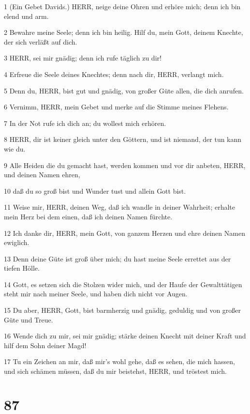 \par 1 (Ein Gebet Davids.) HERR, neige deine Ohren und erhöre mich; denn ich bin elend und arm.
\par 2 Bewahre meine Seele; denn ich bin heilig. Hilf du, mein Gott, deinem Knechte, der sich verläßt auf dich.
\par 3 HERR, sei mir gnädig; denn ich rufe täglich zu dir!
\par 4 Erfreue die Seele deines Knechtes; denn nach dir, HERR, verlangt mich.
\par 5 Denn du, HERR, bist gut und gnädig, von großer Güte allen, die dich anrufen.
\par 6 Vernimm, HERR, mein Gebet und merke auf die Stimme meines Flehens.
\par 7 In der Not rufe ich dich an; du wollest mich erhören.
\par 8 HERR, dir ist keiner gleich unter den Göttern, und ist niemand, der tun kann wie du.
\par 9 Alle Heiden die du gemacht hast, werden kommen und vor dir anbeten, HERR, und deinen Namen ehren,
\par 10 daß du so groß bist und Wunder tust und allein Gott bist.
\par 11 Weise mir, HERR, deinen Weg, daß ich wandle in deiner Wahrheit; erhalte mein Herz bei dem einen, daß ich deinen Namen fürchte.
\par 12 Ich danke dir, HERR, mein Gott, von ganzem Herzen und ehre deinen Namen ewiglich.
\par 13 Denn deine Güte ist groß über mich; du hast meine Seele errettet aus der tiefen Hölle.
\par 14 Gott, es setzen sich die Stolzen wider mich, und der Haufe der Gewalttätigen steht mir nach meiner Seele, und haben dich nicht vor Augen.
\par 15 Du aber, HERR, Gott, bist barmherzig und gnädig, geduldig und von großer Güte und Treue.
\par 16 Wende dich zu mir, sei mir gnädig; stärke deinen Knecht mit deiner Kraft und hilf dem Sohn deiner Magd!
\par 17 Tu ein Zeichen an mir, daß mir's wohl gehe, daß es sehen, die mich hassen, und sich schämen müssen, daß du mir beistehst, HERR, und tröstest mich.

\chapter{87}

